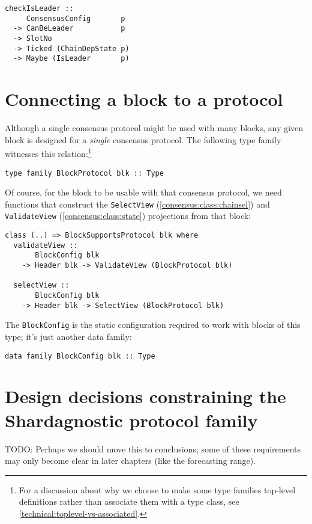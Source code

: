 \begin{lstlisting}
checkIsLeader ::
     ConsensusConfig       p
  -> CanBeLeader           p
  -> SlotNo
  -> Ticked (ChainDepState p)
  -> Maybe (IsLeader       p)
\end{lstlisting}

\section{Connecting a block to a protocol}
\label{BlockSupportsProtocol}

Although a single consensus protocol might be used with many blocks, any given
block is designed for a \emph{single} consensus protocol. The following type
family witnesses this relation:\footnote{For a discussion about why we
choose to make some type families top-level definitions rather than associate
them with a type class, see \cref{technical:toplevel-vs-associated}.}
%
\begin{lstlisting}
type family BlockProtocol blk :: Type
\end{lstlisting}
%
Of course, for the block to be usable with that consensus protocol, we need
functions that construct the \lstinline!SelectView!
(\cref{consensus:class:chainsel}) and \lstinline!ValidateView!
(\cref{consensus:class:state}) projections from that block:
%
\begin{lstlisting}
class (..) => BlockSupportsProtocol blk where
  validateView ::
       BlockConfig blk
    -> Header blk -> ValidateView (BlockProtocol blk)

  selectView ::
       BlockConfig blk
    -> Header blk -> SelectView (BlockProtocol blk)
\end{lstlisting}
The \lstinline!BlockConfig! is the static configuration required to work with
blocks of this type; it's just another data family:
%
\begin{lstlisting}
data family BlockConfig blk :: Type
\end{lstlisting}

\section{Design decisions constraining the Shardagnostic protocol family}
\label{design-decisions-constraining-shardagnostic}

 TODO: Perhaps we should move this to conclusions; some of these
requirements may only become clear in later chapters (like the forecasting
range).


